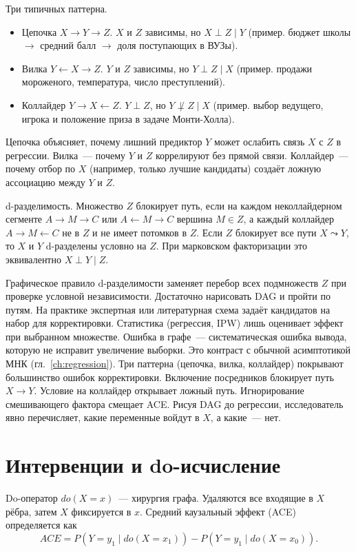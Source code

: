 Три типичных паттерна.
\begin{itemize}
    \item Цепочка $X\to Y\to Z$. $X$ и $Z$ зависимы, но
          $X\perp Z\mid Y$ (пример. бюджет школы $\to$ средний балл $\to$ доля поступающих в ВУЗы).
    \item Вилка $Y\leftarrow X\to Z$. $Y$ и $Z$ зависимы, но
          $Y\perp Z\mid X$ (пример. продажи мороженого, температура, число преступлений).
    \item Коллайдер $Y\to X\leftarrow Z$. $Y\perp Z$, но
          $Y\not\perp Z\mid X$ (пример. выбор ведущего, игрока и положение приза в задаче Монти-Холла).
\end{itemize}
Цепочка объясняет, почему лишний предиктор $Y$ может ослабить связь $X$ с $Z$ в регрессии. Вилка~--- почему $Y$ и $Z$ коррелируют без прямой связи. Коллайдер~--- почему отбор по $X$ (например, только лучшие кандидаты) создаёт ложную ассоциацию между $Y$ и $Z$.

d-разделимость. Множество $Z$ блокирует путь, если на каждом неколлайдерном сегменте $A\to M\to C$ или $A\leftarrow M\to C$ вершина $M\in Z$, а каждый коллайдер $A\to M\leftarrow C$ не в $Z$ и не имеет потомков в $Z$.
Если $Z$ блокирует все пути $X\leadsto Y$, то $X$ и $Y$ d-разделены условно на $Z$. При марковском факторизации это эквивалентно $X\perp Y\mid Z$.

Графическое правило d-разделимости заменяет перебор всех подмножеств $Z$ при проверке условной независимости. Достаточно нарисовать DAG и пройти по путям.
На практике экспертная или литературная схема задаёт кандидатов на набор для корректировки. Статистика (регрессия, IPW) лишь оценивает эффект при выбранном множестве.
Ошибка в графе~--- систематическая ошибка вывода, которую не исправит увеличение выборки. Это контраст с обычной асимптотикой МНК (гл.~\ref{ch:regression}).
Три паттерна (цепочка, вилка, коллайдер) покрывают большинство ошибок корректировки. Включение посредников блокирует путь $X\to Y$. Условие на коллайдер открывает ложный путь. Игнорирование смешивающего фактора смещает ACE.
Рисуя DAG до регрессии, исследователь явно перечисляет, какие переменные войдут в $X$, а какие~--- нет.

\section{Интервенции и do-исчисление}

\begin{definition}
Do-оператор $do(X=x)$~--- хирургия графа. Удаляются все входящие в $X$ рёбра, затем $X$ фиксируется в $x$.
Средний каузальный эффект (ACE) определяется как
\[ ACE = P(Y=y_1\mid do(X=x_1)) - P(Y=y_1\mid do(X=x_0)).
\]
\end{definition}


